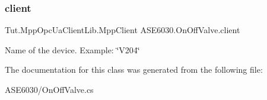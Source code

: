 \subsubsection{\texorpdfstring{client}{client}}
{\footnotesize\ttfamily Tut.\+Mpp\+Opc\+Ua\+Client\+Lib.\+Mpp\+Client A\+S\+E6030.\+On\+Off\+Valve.\+client\hspace{0.3cm}{\ttfamily [private]}}

Name of the device. Example\+: \char`\"{}\+V204\char`\"{} 

The documentation for this class was generated from the following file\+:\begin{DoxyCompactItemize}
\item 
A\+S\+E6030/On\+Off\+Valve.\+cs\end{DoxyCompactItemize}
